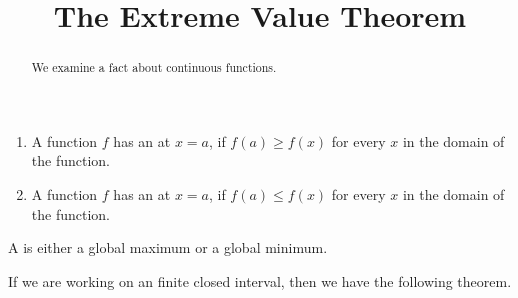 \documentclass{ximera}
\title[Dig-In:]{The Extreme Value Theorem}
\begin{document}
\begin{abstract}
  We examine a fact about continuous functions.
\end{abstract}
\maketitle

\begin{definition}\hfil{}
\begin{enumerate}
\item A function $f$ has an  at $x=a$, if $f(a)\ge
  f(x)$ for every $x$ in the domain of the function.
\item A function $f$ has an  at $x=a$, if $f(a)\le
  f(x)$ for every $x$ in the domain of the function.
\end{enumerate} 
A  is either a
global maximum or a global minimum.
\end{definition}

If we are working on an finite closed interval, then we have the
following theorem.
\end{document}
